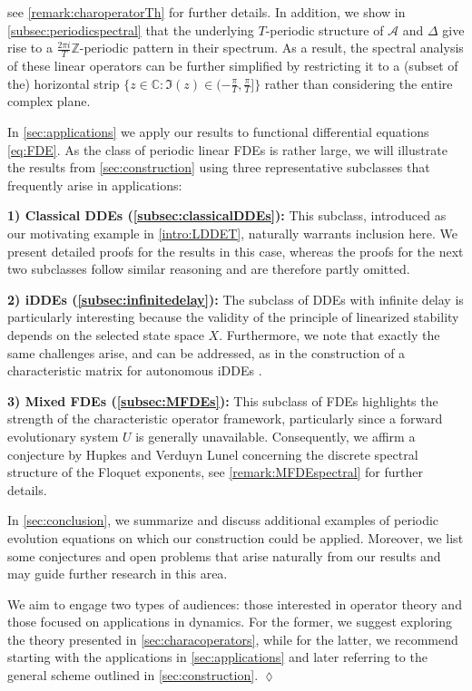 \documentclass[english]{myarticle}
\begin{document}
\begin{sloppypar}
see \cref{remark:charoperatorTh} for further details. In addition, we show in \cref{subsec:periodicspectral} that the underlying $T$-periodic structure of $\mathcal{A}$ and $\Delta$ give rise to a $\frac{2 \pi i}{T} \mathbb{Z}$-periodic pattern in their spectrum. As a result, the spectral analysis of these linear operators can be further simplified by restricting it to a (subset of the) horizontal strip $\{z \in \mathbb{C} : \Im(z) \in (-\frac{\pi}{T}, \frac{\pi}{T}] \}$ rather than considering the entire complex plane.

In \cref{sec:applications} we apply our results to functional differential equations \eqref{eq:FDE}. As the class of periodic linear FDEs is rather large, we will illustrate the results from \cref{sec:construction} using three representative subclasses that frequently arise in applications:

\textbf{1) Classical DDEs (\cref{subsec:classicalDDEs}):} This subclass, introduced as our motivating example in \eqref{intro:LDDET}, naturally warrants inclusion here. We present detailed proofs for the results in this case, whereas the proofs for the next two subclasses follow similar reasoning and are therefore partly omitted. 

\textbf{2) iDDEs (\cref{subsec:infinitedelay}):} The subclass of DDEs with infinite delay is particularly interesting because the validity of the principle of linearized stability depends on the selected state space $X$. Furthermore, we note that exactly the same challenges arise, and can be addressed, as in the construction of a characteristic matrix for autonomous iDDEs \cite[Section II.1.3]{Kaashoek1992}. 

\textbf{3) Mixed FDEs (\cref{subsec:MFDEs}):} This subclass of FDEs highlights the strength of the characteristic operator framework, particularly since a forward evolutionary system $U$ is generally unavailable. Consequently, we affirm a conjecture by Hupkes and Verduyn Lunel \cite[Hypothesis (HF)]{Hupkes2008} concerning the discrete spectral structure of the Floquet exponents, see \cref{remark:MFDEspectral} for further details.

In \cref{sec:conclusion}, we summarize and discuss additional examples of periodic evolution equations on which our construction could be applied. Moreover, we list some conjectures and open problems that arise naturally from our results and may guide further research in this area.

\begin{remark}
We aim to engage two types of audiences: those interested in operator theory and those focused on applications in dynamics. For the former, we suggest exploring the theory presented in \cref{sec:characoperators}, while for the latter, we recommend starting with the applications in \cref{sec:applications} and later referring to the general scheme outlined in \cref{sec:construction}. \hfill $\lozenge$
\end{remark}


\end{sloppypar}
\end{document}
